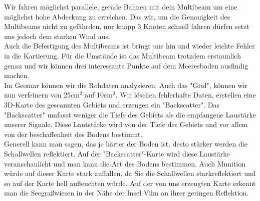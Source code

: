 Wir fahren möglichst parallele, gerade Bahnen mit dem Multibeam um eine möglichst hohe Abdeckung zu erreichen. 
Das wir, um die Genauigkeit des Multibeams nicht zu gefährden, nur knapp 3 Knoten schnell fahren dürfen setzt
uns jedoch dem starken Wind aus. \\

Auch die Befestigung des Multibeams ist bringt uns hin und wieder leichte Fehler in die Kartierung. Für die 
Umstände ist das Multibeam trotzdem erstaunlich genau und wir können drei interessante Punkte auf dem 
Meeresboden ausfindig machen. \\
Im Geomar können wir die Rohdaten analysieren. Auch das "Grid", können wir nun verfeinern von 25cm$^2$ auf 10cm$^2$. 
Wir löschen fehlerhafte Daten, erstellen eine 3D-Karte des gescannten Gebiets und erzeugen ein "Backscatter". 
Das "Backscatter" umfasst weniger die Tiefe des Gebiets als die empfangene Laustärke unserer Signale. 
Diese Lautstärke wird von der Tiefe des Gebiets und vor allem von der beschaffenheit des Bodens bestimmt. \\

Generell kann man sagen, das je härter der Boden ist, desto stärker werden die Schallwellen reflektiert. 
Auf der "Backscatter"-Karte wird diese Laustärke veranschaulicht und man kann die Art des Bodens bestimmen.
Auch Munition würde auf dieser Karte stark auffallen, da Sie die Schallwellen starkreflektiert und so 
auf der Karte hell aufleuchten würde. Auf der von uns erzeugten Karte erkennt man die Seegraßwiesen in 
der Nähe der Insel Vilm an ihrer geringen Reflektion.